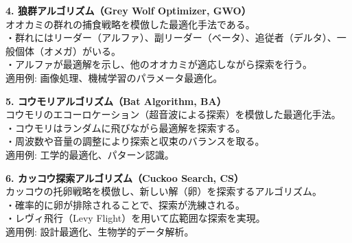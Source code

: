 \documentclass[a4paper]{ltjsarticle}
\begin{document}
\begin{tcolorbox}[arc=6mm, enhanced, borderline={0.5mm}{0mm}{black}, breakable, colback = white]
    \vspace{10pt}
    
    \noindent \textbf{4. 狼群アルゴリズム（Grey Wolf Optimizer, GWO）}\\
    オオカミの群れの捕食戦略を模倣した最適化手法である。\\
    ・群れにはリーダー（アルファ）、副リーダー（ベータ）、追従者（デルタ）、一般個体（オメガ）がいる。\\
    ・アルファが最適解を示し、他のオオカミが適応しながら探索を行う。\\
    適用例: 画像処理、機械学習のパラメータ最適化。
    
    \vspace{10pt}
    
    \noindent \textbf{5. コウモリアルゴリズム（Bat Algorithm, BA）}\\
    コウモリのエコーロケーション（超音波による探索）を模倣した最適化手法。\\
    ・コウモリはランダムに飛びながら最適解を探索する。\\
    ・周波数や音量の調整により探索と収束のバランスを取る。\\
    適用例: 工学的最適化、パターン認識。
    
    \vspace{10pt}
    
    \noindent \textbf{6. カッコウ探索アルゴリズム（Cuckoo Search, CS）}\\
    カッコウの托卵戦略を模倣し、新しい解（卵）を探索するアルゴリズム。\\
    ・確率的に卵が排除されることで、探索が洗練される。\\
    ・レヴィ飛行（Levy Flight）を用いて広範囲な探索を実現。\\
    適用例: 設計最適化、生物学的データ解析。
\end{tcolorbox}    
\end{document}

